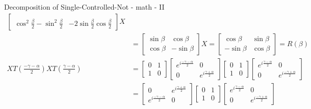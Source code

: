\documentclass{beamer}
\begin{document}
\begin{frame}{Decomposition of Single-Controlled-Not - math - II}
{\begin{align*}
\begin{bmatrix}
        \\
        \cos^2 \frac{\beta}{2} - \sin ^2 \frac{\beta}{2} & - 2 \sin \frac{\beta}{2} \cos \frac{\beta}{2}
      \end{bmatrix} 
      X
      \\
      &=
      \begin{bmatrix} 
        \sin \beta &  \cos \beta\\
        \cos \beta & -\sin \beta
      \end{bmatrix} 
      X
      =
      \begin{bmatrix} 
        \cos \beta &  \sin \beta\\
        -\sin \beta & \cos \beta
      \end{bmatrix} 
      = R(\beta)
      \\
      X T(\frac{-\gamma - \alpha}{2})  X  T(\frac{\gamma - \alpha}{2})
      &=
      \begin{bmatrix} 
        0 & 1 \\
        1 & 0
      \end{bmatrix} 
      \begin{bmatrix} 
        e^{i\frac{-\gamma - \alpha}{2}} & 0 \\
        0 & e^{i\frac{\gamma + \alpha}{2}}
      \end{bmatrix} 
      \begin{bmatrix} 
        0 & 1 \\
        1 & 0
      \end{bmatrix} 
      \begin{bmatrix} 
        e^{i\frac{\gamma - \alpha}{2}} & 0 \\
        0 & e^{i\frac{-\gamma + \alpha}{2}}
      \end{bmatrix} 
      \\
      &=
      \begin{bmatrix} 
        0 & e^{i\frac{\gamma + \alpha}{2}} \\
        e^{i\frac{-\gamma - \alpha}{2}} & 0
      \end{bmatrix} 
      \begin{bmatrix} 
        0 & 1 \\
        1 & 0
      \end{bmatrix} 
      \begin{bmatrix} 
        e^{i\frac{\gamma - \alpha}{2}} & 0 \\
        0 & e^{i\frac{-\gamma + \alpha}{2}}
      \end{bmatrix} 
      \\

\end{align*}}
\end{frame}
\end{document}
